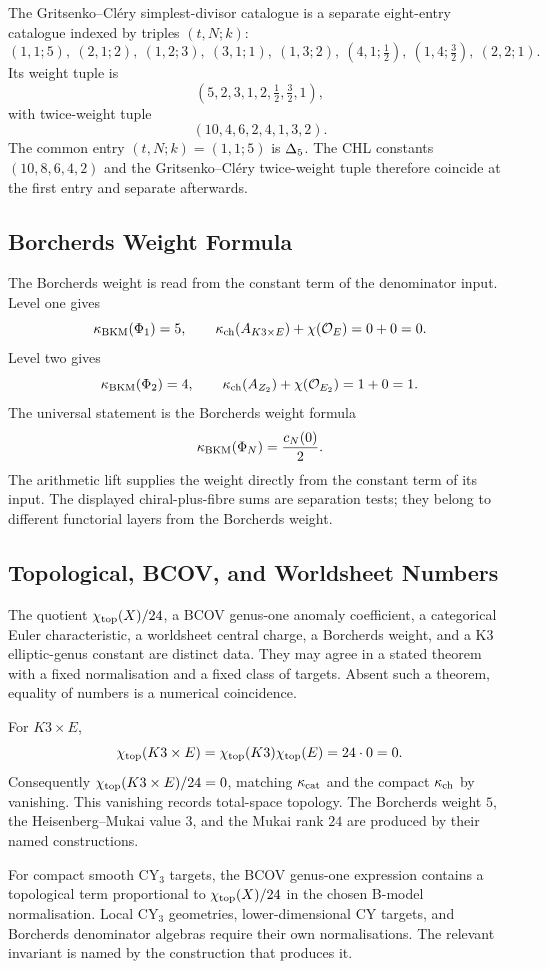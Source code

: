 The Gritsenko--Cl\'ery simplest-divisor catalogue is a separate
eight-entry catalogue indexed by triples $(t,N;k)$:
\[
  (1,1;5),\ (2,1;2),\ (1,2;3),\ (3,1;1),\ (1,3;2),\
  (4,1;\tfrac12),\ (1,4;\tfrac32),\ (2,2;1).
\]
Its weight tuple is
\[
  (5,2,3,1,2,\tfrac12,\tfrac32,1),
\]
with twice-weight tuple
\[
  (10,4,6,2,4,1,3,2).
\]
The common entry $(t,N;k)=(1,1;5)$ is $\Delta_5$.  The CHL constants
$(10,8,6,4,2)$ and the Gritsenko--Cl\'ery twice-weight tuple therefore
coincide at the first entry and separate afterwards.

\subsection*{Borcherds Weight Formula}

The Borcherds weight is read from the constant term of the denominator
input.  Level one gives
\[
  \kappa_{\mathrm{BKM}}(\Phi_1)=5,
  \qquad
  \kappa_{\mathrm{ch}}(A_{K3\times E})+\chi(\mathcal O_E)=0+0=0.
\]
Level two gives
\[
  \kappa_{\mathrm{BKM}}(\Phi_2)=4,
  \qquad
  \kappa_{\mathrm{ch}}(A_{Z_2})+\chi(\mathcal O_{E_2})=1+0=1.
\]
The universal statement is the Borcherds weight formula
\[
  \kappa_{\mathrm{BKM}}(\Phi_N)=\frac{c_N(0)}{2}.
\]
The arithmetic lift supplies the weight directly from the constant term
of its input.  The displayed chiral-plus-fibre sums are separation
tests; they belong to different functorial layers from the Borcherds
weight.

\subsection*{Topological, BCOV, and Worldsheet Numbers}

The quotient $\chi_{\mathrm{top}}(X)/24$, a BCOV genus-one anomaly coefficient,
a categorical Euler characteristic, a worldsheet central charge, a
Borcherds weight, and a K3 elliptic-genus constant are distinct data.
They may agree in a stated theorem with a fixed normalisation and a
fixed class of targets.  Absent such a theorem, equality of numbers is
a numerical coincidence.

For $K3\times E$,
\[
  \chi_{\mathrm{top}}(K3\times E)=\chi_{\mathrm{top}}(K3)\chi_{\mathrm{top}}(E)=24\cdot 0=0.
\]
Consequently $\chi_{\mathrm{top}}(K3\times E)/24=0$, matching $\kappa_{\mathrm{cat}}$ and the
compact $\kappa_{\mathrm{ch}}$ by vanishing.  This vanishing records total-space
topology.  The Borcherds weight $5$, the Heisenberg--Mukai value $3$,
and the Mukai rank $24$ are produced by their named constructions.

For compact smooth CY$_3$ targets, the BCOV genus-one expression
contains a topological term proportional to $\chi_{\mathrm{top}}(X)/24$ in the
chosen B-model normalisation.  Local CY$_3$ geometries, lower-dimensional
CY targets, and Borcherds denominator algebras require their own
normalisations.  The relevant invariant is named by the construction
that produces it.

